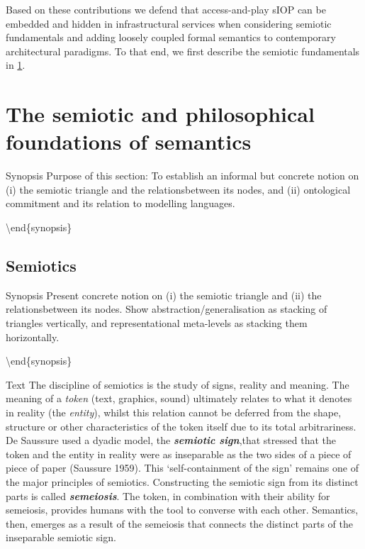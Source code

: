 \documentclass[a4paper,11pt,oneside,oldfontcommands]{memoir}
\newcounter{para}
\theoremstyle{definition}
\theoremstyle{break}		%
\numberwithin{equation}{chapter}
\numberwithin{figure}{chapter}
\begin{document}
Based on these contributions we defend that access-and-play sIOP can be
embedded and hidden in infrastructural services when considering
semiotic fundamentals and adding loosely coupled formal semantics to
contemporary architectural paradigms. To that end, we first describe the
semiotic fundamentals in
\cref{the-semiotic-and-philosophical-foundations-of-semantics}.

\hypertarget{the-semiotic-and-philosophical-foundations-of-semantics}{%
\chapter{The semiotic and philosophical foundations of
semantics}\label{the-semiotic-and-philosophical-foundations-of-semantics}}

Synopsis Purpose of this section: To establish an informal but concrete
notion on (i) the semiotic triangle and the relationsbetween its nodes,
and (ii) ontological commitment and its relation to modelling languages.

\textbackslash{}end\{synopsis\}

\hypertarget{semiotics}{%
\section{Semiotics}\label{semiotics}}

Synopsis Present concrete notion on (i) the semiotic triangle and (ii)
the relationsbetween its nodes. Show abstraction/generalisation as
stacking of triangles vertically, and representational meta-levels as
stacking them horizontally.

\textbackslash{}end\{synopsis\}

Text The discipline of semiotics is the study of signs, reality and
meaning. The meaning of a \emph{token} (text, graphics, sound)
ultimately relates to what it denotes in reality (the \emph{entity}),
whilst this relation cannot be deferred from the shape, structure or
other characteristics of the token itself due to its total
arbitrariness. De Saussure used a dyadic model, the
\textbf{\emph{semiotic sign}},that stressed that the token and the
entity in reality were as inseparable as the two sides of a piece of
piece of paper (Saussure 1959). This `self-containment of the sign'
remains one of the major principles of semiotics. Constructing the
semiotic sign from its distinct parts is called
\textbf{\emph{semeiosis}}. The token, in combination with their ability
for semeiosis, provides humans with the tool to converse with each
other. Semantics, then, emerges as a result of the semeiosis that
connects the distinct parts of the inseparable semiotic sign.
\end{document}
